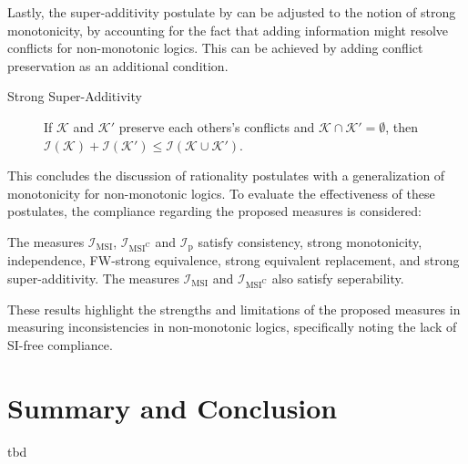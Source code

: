 Lastly, the super-additivity postulate by \cite{thimm_measuring_2009} can be adjusted to the notion of strong monotonicity, by accounting for the fact that adding information might resolve conflicts for non-monotonic logics. This can be achieved by adding conflict preservation as an additional condition.

\begin{description}
    \item[Strong Super-Additivity] If \(\mathcal{K}\) and \(\mathcal{K}'\) preserve each others's conflicts and \(\mathcal{K} \cap \mathcal{K}' = \emptyset\), then \(\mathcal{I}(\mathcal{K}) + \mathcal{I}(\mathcal{K}') \leq \mathcal{I}(\mathcal{K} \cup \mathcal{K}')\).
\end{description}

This concludes the discussion of rationality postulates with a generalization of monotonicity for non-monotonic logics. To evaluate the effectiveness of these postulates, the compliance regarding the proposed measures is considered:

\begin{proposition}
    The measures \(\mathcal{I}_{\text{MSI}}\), \(\mathcal{I}_{\text{MSI}^\text{C}}\) and \(\mathcal{I}_{\text{p}}\) satisfy consistency, strong monotonicity, independence, FW-strong equivalence, strong equivalent replacement, and strong super-additivity. The measures \(\mathcal{I}_{\text{MSI}}\) and \(\mathcal{I}_{\text{MSI}^\text{C}}\) also satisfy seperability.
\end{proposition}

These results highlight the strengths and limitations of the proposed measures in measuring inconsistencies in non-monotonic logics, specifically noting the lack of SI-free compliance.

\section{Summary and Conclusion}
tbd